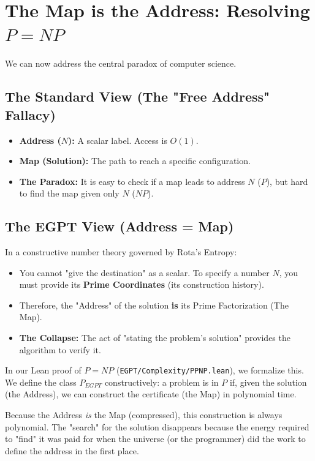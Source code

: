 \documentclass{report}
\begin{document}
\section{The Map is the Address: Resolving $P=NP$}

We can now address the central paradox of computer science.

\subsection{The Standard View (The "Free Address" Fallacy)}
\begin{itemize}
    \item \textbf{Address ($N$):} A scalar label. Access is $O(1)$.
    \item \textbf{Map (Solution):} The path to reach a specific configuration.
    \item \textbf{The Paradox:} It is easy to check if a map leads to address $N$ ($P$), but hard to find the map given only $N$ ($NP$).
\end{itemize}

\subsection{The EGPT View (Address = Map)}
In a constructive number theory governed by Rota's Entropy:
\begin{itemize}
    \item You cannot "give the destination" as a scalar. To specify a number $N$, you must provide its \textbf{Prime Coordinates} (its construction history).
    \item Therefore, the "Address" of the solution \textbf{is} its Prime Factorization (The Map).
    \item \textbf{The Collapse:} The act of "stating the problem's solution" provides the algorithm to verify it.
\end{itemize}

In our Lean proof of $P=NP$ (\texttt{EGPT/Complexity/PPNP.lean}), we formalize this. We define the class $P_{EGPT}$ constructively: a problem is in $P$ if, given the solution (the Address), we can construct the certificate (the Map) in polynomial time.

Because the Address \textit{is} the Map (compressed), this construction is always polynomial. The "search" for the solution disappears because the energy required to "find" it was paid for when the universe (or the programmer) did the work to define the address in the first place.
\end{document}
